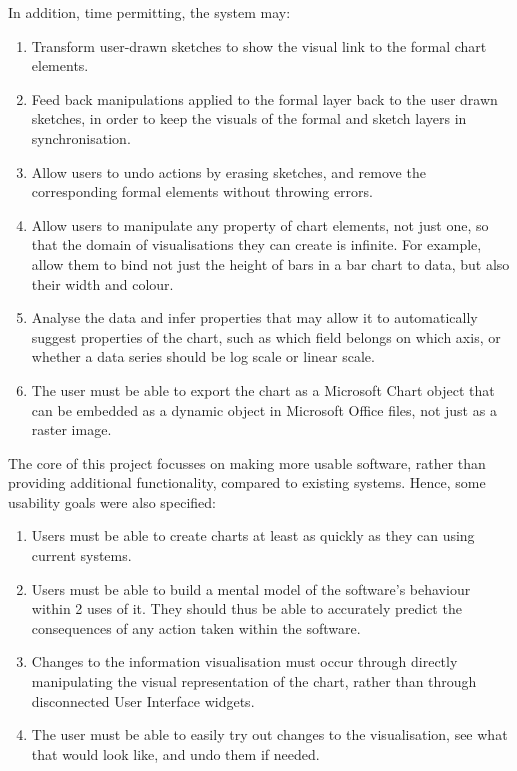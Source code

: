 	In addition, time permitting, the system may:
	\begin{enumerate}[label=\bfseries Extension \arabic*:]
		\item Transform user-drawn sketches to show the visual link to the formal chart elements.
		\item Feed back manipulations applied to the formal layer back to the user drawn sketches, in order to keep the visuals of the formal and sketch layers in synchronisation.
		\item Allow users to undo actions by erasing sketches, and remove the corresponding formal elements without throwing errors.
		\item Allow users to manipulate any property of chart elements, not just one, so that the domain of visualisations they can create is infinite. For example, allow them to bind not just the height of bars in a bar chart to data, but also their width and colour. 
		\item Analyse the data and infer properties that may allow it to automatically suggest properties of the chart, such as which field belongs on which axis, or whether a data series should be log scale or linear scale.
		\item The user must be able to export the chart as a Microsoft Chart object that can be embedded as a dynamic object in Microsoft Office files, not just as a raster image.
	\end{enumerate}
	
	The core of this project focusses on making more usable software, rather than providing additional functionality, compared to existing systems. Hence, some usability goals were also specified:
	\begin{enumerate}[label=\bfseries Usability \arabic*:]
		\item Users must be able to create charts at least as quickly as they can using current systems.
		\item Users must be able to build a mental model of the software's behaviour within 2 uses of it. They should thus be able to accurately predict the consequences of any action taken within the software.
		\item Changes to the information visualisation must occur through directly manipulating the visual representation of the chart, rather than through disconnected User Interface widgets.
		\item The user must be able to easily try out changes to the visualisation, see what that would look like, and undo them if needed.
	\end{enumerate}
	
